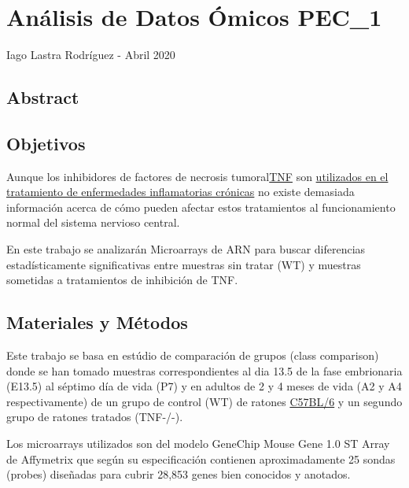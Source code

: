 \documentclass[
]{article}
\author{}
\date{}
\begin{document}
\hypertarget{header-n1203}{%
\section{Análisis de Datos Ómicos PEC\_1}\label{header-n1203}}

Iago Lastra Rodríguez - Abril 2020

\tableofcontents

\hypertarget{header-n1207}{%
\subsection{Abstract}\label{header-n1207}}

\hypertarget{header-n1208}{%
\subsection{Objetivos}\label{header-n1208}}

Aunque los inhibidores de factores de necrosis
tumoral\href{https://es.wikipedia.org/wiki/Factor_de_necrosis_tumoral}{TNF}
son \href{https://www.ncbi.nlm.nih.gov/pubmed/15370396}{utilizados en el
tratamiento de enfermedades inflamatorias crónicas} no existe demasiada
información acerca de cómo pueden afectar estos tratamientos al
funcionamiento normal del sistema nervioso central.

En este trabajo se analizarán Microarrays de ARN para buscar diferencias
estadísticamente significativas entre muestras sin tratar (WT) y
muestras sometidas a tratamientos de inhibición de TNF.

\hypertarget{header-n1211}{%
\subsection{Materiales y Métodos}\label{header-n1211}}

Este trabajo se basa en estúdio de comparación de grupos (class
comparison) donde se han tomado muestras correspondientes al dia 13.5 de
la fase embrionaria (E13.5) al séptimo día de vida (P7) y en adultos de
2 y 4 meses de vida (A2 y A4 respectivamente) de un grupo de control
(WT) de ratones \href{https://en.wikipedia.org/wiki/C57BL/6}{C57BL/6} y
un segundo grupo de ratones tratados (TNF-/-).

Los microarrays utilizados son del modelo GeneChip Mouse Gene 1.0 ST
Array de Affymetrix que según su especificación contienen
aproximadamente 25 sondas (probes) diseñadas para cubrir 28,853 genes
bien conocidos y anotados.
\end{document}
